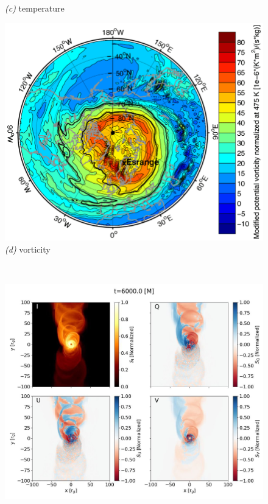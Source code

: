 \documentclass{article}
\newenvironment{hoggfigure}{%
  \begin{figure}[tp]%
    \begin{mdframed}%
    \color{captiongray}}{%
    \end{mdframed}%
  \end{figure}}
\theoremstyle{definition}
\begin{document}
\begin{hoggfigure}
\begin{center}
\begin{minipage}[b]{2.5in}
      \textsl{(c)} temperature
    \end{minipage}
    \begin{minipage}[b]{1.8in}\noindent%
      \includegraphics[width=\textwidth]{The-distribution-of-the-modified-potential-vorticity-at-the-850-K-potential-temperature.png}\\
      \textsl{(d)} vorticity
    \end{minipage}\\[2ex]
    \begin{minipage}[b]{1.9in}\noindent%
      \includegraphics[width=\textwidth]{FbAjqkkWAAANqFc.jpeg}\\

\end{minipage}
\end{center}
\end{hoggfigure}
\end{document}
